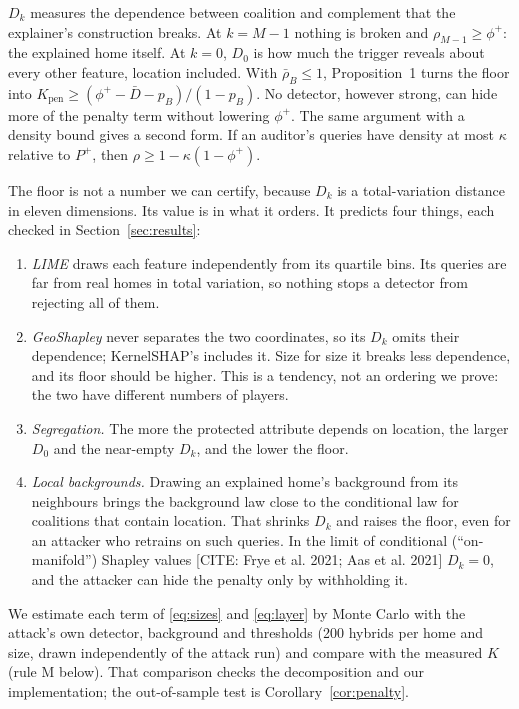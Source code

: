 \documentclass[11pt]{article}
\newcommand{\1}{\mathbf{1}}
\newcommand{\citeneeded}[1]{\textcolor{blue!60!black}{[CITE: #1]}}
\begin{document}
$D_k$ measures the dependence between coalition and complement that the explainer's construction breaks. At $k = M-1$
nothing is broken and $\rho_{M-1} \ge \phi^+$: the explained home itself. At $k = 0$, $D_0$ is how much the trigger
reveals about every other feature, location included. With $\bar\rho_B \le 1$, Proposition~1 turns the floor into
$K_{\mathrm{pen}} \ge (\phi^+ - \bar D - p_B)/(1 - p_B)$. No detector, however strong, can hide more of the penalty term
without lowering $\phi^+$. The same argument with a density bound gives a second form. If an auditor's queries have
density at most $\kappa$ relative to $P^+$, then $\rho \ge 1 - \kappa(1-\phi^+)$.

The floor is not a number we can certify, because $D_k$ is a total-variation distance in eleven dimensions. Its
value is in what it orders. It predicts four things, each checked in Section~\ref{sec:results}:
\begin{enumerate}[label=(\roman*),leftmargin=*]
  \item \emph{LIME} draws each feature independently from its quartile bins. Its queries are far from real homes in
        total variation, so nothing stops a detector from rejecting all of them.
  \item \emph{GeoShapley} never separates the two coordinates, so its $D_k$ omits their dependence; KernelSHAP's
        includes it. Size for size it breaks less dependence, and its floor should be higher. This is a tendency,
        not an ordering we prove: the two have different numbers of players.
  \item \emph{Segregation.} The more the protected attribute depends on location, the larger $D_0$ and the
        near-empty $D_k$, and the lower the floor.
  \item \emph{Local backgrounds.} Drawing an explained home's background from its neighbours brings the background law
        close to the conditional law for coalitions that contain location. That shrinks $D_k$ and raises the floor,
        even for an attacker who retrains on such queries. In the limit of conditional (``on-manifold'') Shapley
        values \citeneeded{Frye et al. 2021; Aas et al. 2021} $D_k = 0$, and the attacker can hide the penalty only by
        withholding it.
\end{enumerate}
We estimate each term of \eqref{eq:sizes} and \eqref{eq:layer} by Monte Carlo with the attack's own detector,
background and thresholds (200 hybrids per home and size, drawn independently of the attack run) and compare with the
measured $K$ (rule M below). That comparison checks the decomposition and our implementation; the out-of-sample test
is Corollary~\ref{cor:penalty}.
\end{document}
